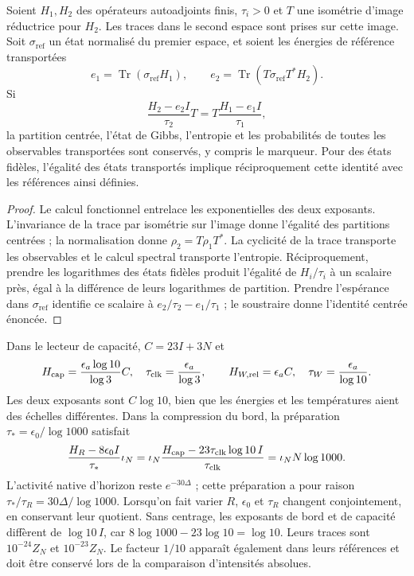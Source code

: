 \begin{theorem}
\label{thm:ii-ter27-transporte}
Soient $H_1,H_2$ des opérateurs autoadjoints finis, $\tau_i>0$ et $T$ une isométrie
d’image réductrice pour $H_2$. Les traces dans le second espace sont
prises sur cette image. Soit $\sigma_{\mathrm{ref}}$ un état normalisé
du premier espace, et soient les énergies de référence transportées
\[
 e_1=\operatorname{Tr}(\sigma_{\mathrm{ref}}H_1),\qquad
 e_2=\operatorname{Tr}(T\sigma_{\mathrm{ref}}T^*H_2).
\]
Si
\[
 \frac{H_2-e_2I}{\tau_2}T
 =T\frac{H_1-e_1I}{\tau_1},
\]
la partition centrée, l’état de Gibbs, l’entropie et
les probabilités de toutes les observables transportées sont conservés, y compris le
marqueur. Pour des états fidèles, l’égalité des états transportés
implique réciproquement cette identité avec les références ainsi définies.
\end{theorem}
\begin{proof}
Le calcul fonctionnel entrelace les exponentielles des deux exposants.
L’invariance de la trace par isométrie sur l’image donne l’égalité des
partitions centrées ; la normalisation donne $\rho_2=T\rho_1T^*$.
La cyclicité de la trace transporte les observables et le calcul spectral
transporte l’entropie. Réciproquement, prendre les logarithmes des états
fidèles produit l’égalité de $H_i/\tau_i$ à un scalaire près, égal à la
différence de leurs logarithmes de partition. Prendre l’espérance dans
$\sigma_{\mathrm{ref}}$ identifie ce scalaire à
$e_2/\tau_2-e_1/\tau_1$ ; le soustraire donne l’identité centrée énoncée.
\end{proof}

Dans le lecteur de capacité, $C=23I+3N$ et
\begin{equation}
 H_{\rm cap}=\frac{\epsilon_a\log10}{\log3}C,
 \quad\tau_{\rm clk}=\frac{\epsilon_a}{\log3},\qquad
 H_{W,\rm rel}=\epsilon_a C,
 \quad\tau_W=\frac{\epsilon_a}{\log10}.
 \label{eq:ii-ter27-hcap}
\end{equation}
Les deux exposants sont $C\log10$, bien que les énergies et les températures aient
des échelles différentes. Dans la compression du bord, la préparation
$\tau_*=\epsilon_0/\log1000$ satisfait
\[
 \frac{H_R-8\epsilon_0I}{\tau_*}\iota_N
 =\iota_N\frac{H_{\rm cap}-23\tau_{\rm clk}\log10\,I}{\tau_{\rm clk}}
 =\iota_N N\log1000.
\]
L’activité native d’horizon reste $e^{-30\Delta}$ ; cette
préparation a pour raison $\tau_*/\tau_R=30\Delta/\log1000$. Lorsqu’on fait varier
$R$, $\epsilon_0$ et $\tau_R$ changent conjointement, en conservant leur quotient.
Sans centrage, les exposants de bord et de capacité diffèrent de
$\log10\,I$, car $8\log1000-23\log10=\log10$. Leurs traces sont
$10^{-24}Z_N$ et $10^{-23}Z_N$. Le facteur $1/10$ apparaît également dans
leurs références et doit être conservé lors de la comparaison d’intensités absolues.

